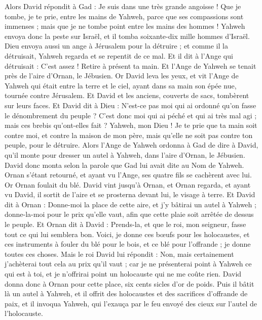 \begin{multicols}{2}
Alors David répondit à Gad : Je suis dans une très grande angoisse ! Que je tombe, je te prie, entre les mains de Yahweh, parce que ses compassions sont immenses ; mais que je ne tombe point entre les mains des hommes !
Yahweh envoya donc la peste sur Israël, et il tomba soixante-dix mille hommes d'Israël.
Dieu envoya aussi un ange à Jérusalem pour la détruire ; et comme il la détruisait, Yahweh regarda et se repentit de ce mal. Et il dit à l'Ange qui détruisait : C'est assez ! Retire à présent ta main. Et l'Ange de Yahweh se tenait près de l'aire d'Ornan, le Jébusien.
Or David leva les yeux,  et vit l'Ange de Yahweh qui était entre la terre et le ciel, ayant dans sa main son épée nue, tournée contre Jérusalem. Et David et les anciens, couverts de sacs, tombèrent sur leurs faces.
Et David dit à Dieu : N'est-ce pas moi qui ai ordonné qu'on fasse le dénombrement du peuple ? C'est donc moi qui ai péché et qui ai très mal agi ; mais ces brebis qu'ont-elles fait ? Yahweh, mon Dieu ! Je te prie que ta main soit contre moi, et contre la maison de mon père, mais qu'elle ne soit pas contre ton peuple, pour le détruire.
Alors l'Ange de Yahweh ordonna à Gad de dire à David, qu'il monte pour dresser un autel à Yahweh, dans l'aire d'Ornan, le Jébusien.
David donc monta selon la parole que Gad lui avait dite au Nom de Yahweh.
Ornan s'étant retourné, et ayant vu l'Ange,  ses quatre fils se cachèrent avec lui. Or Ornan foulait du blé.
David vint jusqu'à Ornan, et Ornan regarda, et ayant vu David, il sortit de l'aire et se prosterna devant lui, le visage à terre.
Et David dit à Ornan : Donne-moi la place de cette aire, et j'y bâtirai un autel à Yahweh ; donne-la-moi pour le prix qu'elle vaut, afin que cette plaie soit arrêtée de dessus le peuple.
Et Ornan dit à David : Prends-la, et que le roi, mon seigneur, fasse tout ce qui lui semblera bon. Voici, je donne ces bœufs pour les holocaustes, et ces instruments à fouler du blé pour le bois, et ce blé pour l'offrande ; je donne toutes ces choses.
Mais le roi David lui répondit : Non, mais certainement j'achèterai tout cela au prix qu'il vaut ; car je ne présenterai point à Yahweh ce qui est à toi, et je n'offrirai point un holocauste qui ne me coûte rien.
David donna donc à Ornan pour cette place, six cents sicles d'or de poids.
Puis il bâtit là un autel à Yahweh, et il offrit des holocaustes et des sacrifices d’offrande de paix, et il invoqua Yahweh, qui l'exauça par le feu envoyé des cieux sur l'autel de l'holocauste.

\end{multicols}
